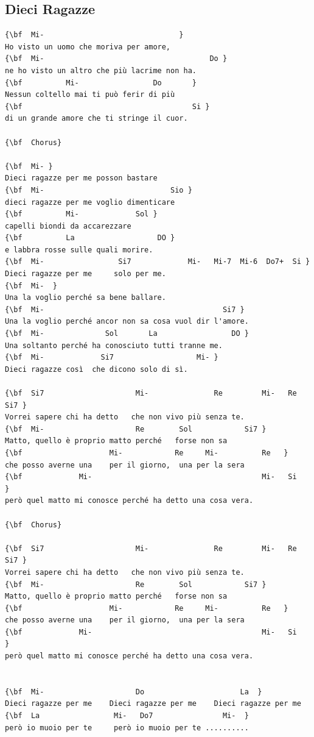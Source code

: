 \documentclass[a4paper]{article}
\begin{document}
\subsection{Dieci Ragazze}
\begin{Verbatim}[commandchars=\\\{\}]
{\bf  Mi-                               }
Ho visto un uomo che moriva per amore, 
{\bf  Mi-                                      Do }
ne ho visto un altro che più lacrime non ha. 
{\bf          Mi-                 Do       }
Nessun coltello mai ti può ferir di più 
{\bf                                       Si }
di un grande amore che ti stringe il cuor. 

{\bf  Chorus}

{\bf  Mi- }
Dieci ragazze per me posson bastare 
{\bf  Mi-                             Sio }
dieci ragazze per me voglio dimenticare 
{\bf          Mi-             Sol }
capelli biondi da accarezzare 
{\bf          La                   DO }
e labbra rosse sulle quali morire. 
{\bf  Mi-                 Si7             Mi-   Mi-7  Mi-6  Do7+  Si }
Dieci ragazze per me     solo per me. 
{\bf  Mi-  }
Una la voglio perché sa bene ballare. 
{\bf  Mi-                                         Si7 }
Una la voglio perché ancor non sa cosa vuol dir l'amore. 
{\bf  Mi-              Sol       La                 DO }
Una soltanto perché ha conosciuto tutti tranne me. 
{\bf  Mi-             Si7                   Mi- }
Dieci ragazze così  che dicono solo di sì. 

{\bf  Si7                     Mi-               Re         Mi-   Re  Si7 }
Vorrei sapere chi ha detto   che non vivo più senza te. 
{\bf  Mi-                     Re        Sol            Si7 }
Matto, quello è proprio matto perché   forse non sa 
{\bf                    Mi-            Re     Mi-          Re   }
che posso averne una    per il giorno,  una per la sera 
{\bf             Mi-                                       Mi-   Si   }
però quel matto mi conosce perché ha detto una cosa vera.   

{\bf  Chorus}

{\bf  Si7                     Mi-               Re         Mi-   Re  Si7 }
Vorrei sapere chi ha detto   che non vivo più senza te. 
{\bf  Mi-                     Re        Sol            Si7 }
Matto, quello è proprio matto perché   forse non sa 
{\bf                    Mi-            Re     Mi-          Re   }
che posso averne una    per il giorno,  una per la sera 
{\bf             Mi-                                       Mi-   Si   }
però quel matto mi conosce perché ha detto una cosa vera.    


{\bf  Mi-                     Do                      La  }
Dieci ragazze per me    Dieci ragazze per me    Dieci ragazze per me   
{\bf  La                 Mi-   Do7                Mi-  }
però io muoio per te     però io muoio per te ..........

\end{Verbatim}
\newpage
\end{document}
